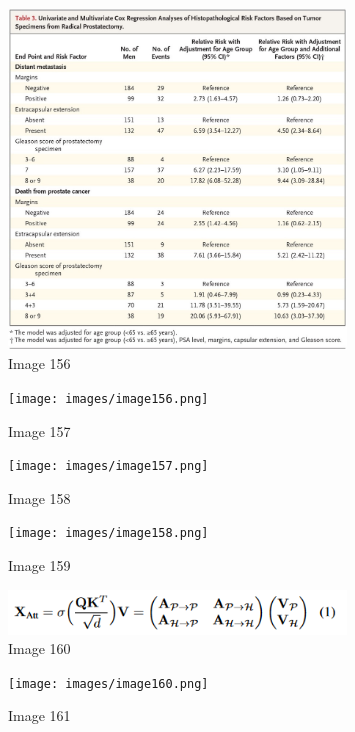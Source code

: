 \documentclass{article}%
\begin{document}
\begin{figure}[h!]%
\centering%
\includegraphics[width=0.8\textwidth]{images/image155.png}%
\caption{Image 156}%
\end{figure}

%


\begin{figure}[h!]%
\centering%
\texttt{[image: images/image156.png]}%
\caption{Image 157}%
\end{figure}

%


\begin{figure}[h!]%
\centering%
\texttt{[image: images/image157.png]}%
\caption{Image 158}%
\end{figure}

%


\begin{figure}[h!]%
\centering%
\texttt{[image: images/image158.png]}%
\caption{Image 159}%
\end{figure}

%


\begin{figure}[h!]%
\centering%
\includegraphics[width=0.8\textwidth]{images/image159.png}%
\caption{Image 160}%
\end{figure}

%


\begin{figure}[h!]%
\centering%
\texttt{[image: images/image160.png]}%
\caption{Image 161}%
\end{figure}
\end{document}
